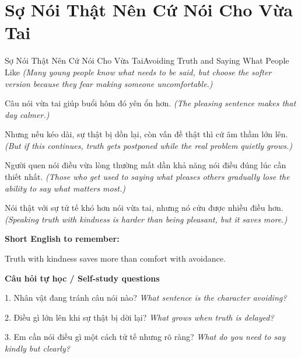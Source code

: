 \section{Sợ Nói Thật Nên Cứ Nói Cho Vừa Tai}
\begin{truyen}{Sợ Nói Thật Nên Cứ Nói Cho Vừa Tai}{Avoiding Truth and Saying What People Like}
\textit{(Many young people know what needs to be said, but choose the softer version because they fear making someone uncomfortable.)}

Câu nói vừa tai giúp buổi hôm đó yên ổn hơn.
\textit{(The pleasing sentence makes that day calmer.)}

Nhưng nếu kéo dài, sự thật bị dồn lại, còn vấn đề thật thì cứ âm thầm lớn lên.
\textit{(But if this continues, truth gets postponed while the real problem quietly grows.)}

Người quen nói điều vừa lòng thường mất dần khả năng nói điều đúng lúc cần thiết nhất.
\textit{(Those who get used to saying what pleases others gradually lose the ability to say what matters most.)}

\end{truyen}

\begin{baihoc}
Nói thật với sự tử tế khó hơn nói vừa tai, nhưng nó cứu được nhiều điều hơn.
\textit{(Speaking truth with kindness is harder than being pleasant, but it saves more.)}
\end{baihoc}

\begin{ghinhoanh}
\textbf{Short English to remember:}

Truth with kindness saves more than comfort with avoidance.

\end{ghinhoanh}

\begin{tuhocnhanh}
\textbf{Câu hỏi tự học / Self-study questions}

1. Nhân vật đang tránh câu nói nào? \textit{What sentence is the character avoiding?}

2. Điều gì lớn lên khi sự thật bị dời lại? \textit{What grows when truth is delayed?}

3. Em cần nói điều gì một cách tử tế nhưng rõ ràng? \textit{What do you need to say kindly but clearly?}
\end{tuhocnhanh}
\ngancach

